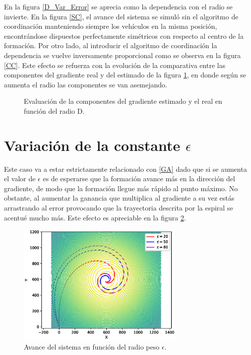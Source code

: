 En la figura \ref{D_Var_Error} se aprecia como la dependencia con el radio se invierte. En la figura \ref{SC}, el avance del sistema se simuló sin el algoritmo de coordinación manteniendo siempre los vehículos en la misma posición, encontrándose dispuestos perfectamente simétricos con respecto al centro de la formación. Por otro lado, al introducir el algoritmo de coordinación la dependencia se vuelve inversamente proporcional como se observa en la figura \ref{CC}. Este efecto se refuerza con la evolución de la comparativa entre las componentes del gradiente real y del estimado de la  figura \ref{Gradiente_Var_D}, en donde según se aumenta el radio las componentes se van asemejando.

\begin{figure}[H]
  \begin{center}
    \caption{Evaluación de la componentes del gradiente estimado y el real en función del radio D.}
    \label{Gradiente_Var_D}
  \end{center}
\end{figure}

\section{Variación de la constante $\epsilon$}

Este caso va a estar estrictamente relacionado con \ref{GA} dado que si se aumenta el valor de $\epsilon$ es de esperarse que la formación avance más en la dirección del gradiente, de modo que la formación llegue más rápido al punto máximo. No obstante, al aumentar la ganancia que multiplica al gradiente a su vez estás arrastrando al error provocando que la trayectoria descrita por la espiral se acentué mucho más. Este efecto es apreciable en la figura \ref{Epsilon_Var}.

\begin{figure}[H]
\centering
\includegraphics[width=0.72\textwidth]{figures/Epsilon_variante/Figure_1.eps}
\caption{Avance del sistema en función del radio peso $\epsilon$.} \label{Epsilon_Var}
\end{figure}

